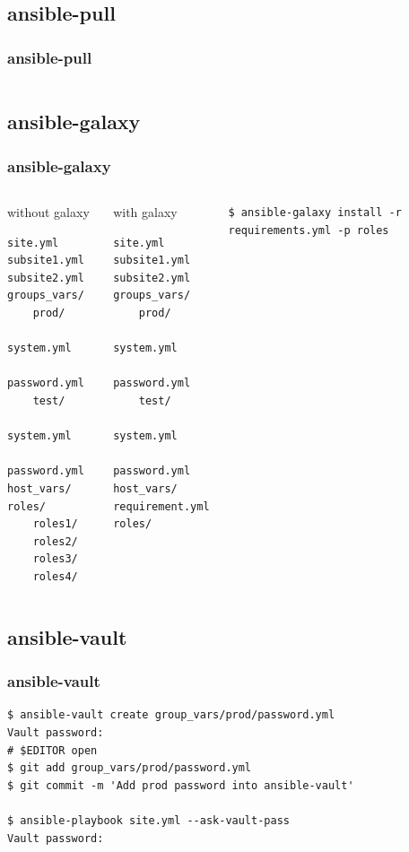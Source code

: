 \documentclass{beamer}
\begin{document}
\subsection{ansible-pull}

\begin{frame}[fragile]
    \frametitle{ansible-pull}
    \tiny{
        \inputminted{shell}{sources/ansible_pull.yml}
    }
\end{frame}

\subsection{ansible-galaxy}

\begin{frame}[fragile]
    \frametitle{ansible-galaxy}
    \begin{columns}
        \begin{block}{without galaxy}
        \footnotesize{
            \begin{Verbatim}[tabsize=4]
site.yml
subsite1.yml
subsite2.yml
groups_vars/
    prod/
        system.yml
        password.yml
    test/
        system.yml
        password.yml
host_vars/
roles/
    roles1/
    roles2/
    roles3/
    roles4/
        \end{Verbatim}
        }
         \end{block}
        \begin{block}{with galaxy}
        \footnotesize{
            \begin{Verbatim}[tabsize=4]
site.yml
subsite1.yml
subsite2.yml
groups_vars/
    prod/
        system.yml
        password.yml
    test/
        system.yml
        password.yml
host_vars/
requirement.yml
roles/
            \end{Verbatim}
        }
    \end{block}
    \begin{verbatim}
$ ansible-galaxy install -r requirements.yml -p roles
    \end{verbatim}
    \end{columns}
\end{frame}

\subsection{ansible-vault}

\begin{frame}[fragile]
    \frametitle{ansible-vault}
    \begin{verbatim}
$ ansible-vault create group_vars/prod/password.yml
Vault password:
# $EDITOR open
$ git add group_vars/prod/password.yml
$ git commit -m 'Add prod password into ansible-vault'

$ ansible-playbook site.yml --ask-vault-pass
Vault password:
    \end{verbatim}
\end{frame}
\end{document}
